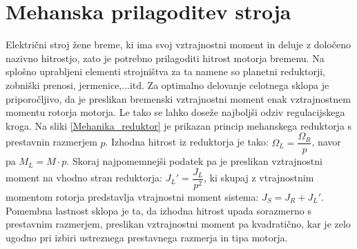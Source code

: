 \documentclass[a4paper,twoside,openright,12pt]{book}
\begin{document}
\chapter{Mehanska prilagoditev stroja}
Električni stroj žene breme, ki ima svoj vztrajnostni moment in deluje z določeno nazivno hitrostjo, zato je potrebno prilagoditi hitrost motorja bremenu. Na splošno uprabljeni elementi strojništva za ta namene so planetni reduktorji, zobniški prenosi, jermenice,...itd. Za optimalno delovanje celotnega sklopa je priporočljivo, da je preslikan bremenski vztrajnostni moment enak vztrajnostnem momentu rotorja motorja. Le tako se lahko doseže najboljši odziv regulacijskega kroga. Na sliki \ref{Mehanika_reduktor} je prikazan princip mehanskega reduktorja s prestavnin razmerjem $p$. Izhodna hitrost iz reduktorja je tako: $\Omega_L = \dfrac{\Omega_R}{p}$, navor pa $M_L=M\cdot p$. Skoraj najpomemnejši podatek pa je preslikan vztrajnostni moment na vhodno stran reduktorja: $J_L'=\dfrac{J_L}{p^2}$, ki skupaj z vtrajnostnim momentom rotorja predstavlja vtrajnostni moment sistema: $J_S=J_R+J_L'$. Pomembna lastnost sklopa je ta, da izhodna hitrost upada sorazmerno s prestavnim razmerjem, preslikan vztrajnostni moment pa kvadratično, kar je zelo ugodno pri izbiri ustreznega prestavnega razmerja in tipa motorja.\\
\end{document}
